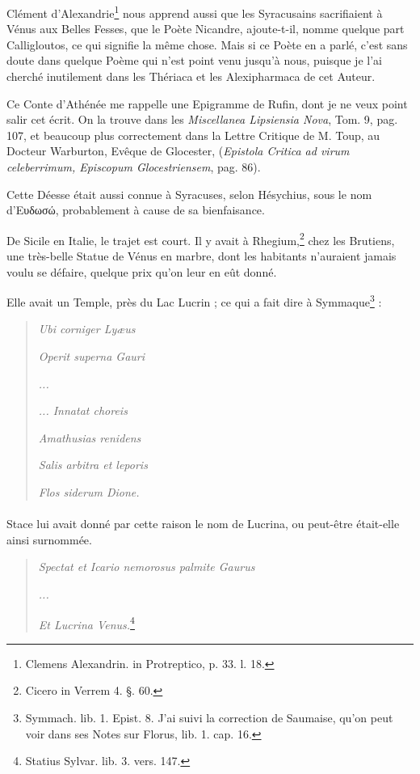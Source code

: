 \documentclass[a4paper, 11pt, oneside, polutonikogreek, french]{article}
\begin{document}
Clément d'Alexandrie\footnote{Clemens Alexandrin. in Protreptico, p. 33. l. 18.} nous apprend aussi que les Syracusains sacrifiaient à Vénus aux Belles Fesses, que le Poète Nicandre, ajoute-t-il, nomme quelque part Calligloutos, ce qui signifie la même chose. Mais si ce Poète en a parlé, c'est sans doute dans quelque Poème qui n'est point venu jusqu'à nous, puisque je l'ai cherché inutilement dans les Thériaca et les Alexipharmaca de cet Auteur.

Ce Conte d'Athénée me rappelle une Epigramme de Rufin, dont je ne veux point salir cet écrit. On la trouve dans les \emph{Miscellanea Lipsiensia Nova}, Tom. 9, pag. 107, et beaucoup plus correctement dans la Lettre Critique de M. Toup, au Docteur Warburton, Evêque de Glocester, (\emph{Epistola Critica ad virum celeberrimum, Episcopum Glocestriensem}, pag. 86).

Cette Déesse était aussi connue à Syracuses, selon Hésychius, sous le nom d'Ευδωσώ, probablement à cause de sa bienfaisance.

De Sicile en Italie, le trajet est court. Il y avait à Rhegium,\footnote{Cicero in Verrem 4. §. 60.} chez les Brutiens, une très-belle Statue de Vénus en marbre, dont les habitants n'auraient jamais voulu se défaire, quelque prix qu'on leur en eût donné.

Elle avait un Temple, près du Lac Lucrin ; ce qui a fait dire à Symmaque\footnote{Symmach. lib. 1. Epist. 8. J'ai suivi la correction de Saumaise, qu'on peut voir dans ses Notes sur Florus, lib. 1. cap. 16.} :
\begin{quotation}
\emph{Ubi corniger Lyæus}

\emph{Operit superna Gauri}

\emph{...}

\emph{... Innatat choreis}

\emph{Amathusias renidens}

\emph{Salis arbitra et leporis}

\emph{Flos siderum Dione.}
\end{quotation}
\paragraph{}
Stace lui avait donné par cette raison le nom de Lucrina, ou peut-être était-elle ainsi surnommée.
\begin{quotation}
\emph{Spectat et Icario nemorosus palmite Gaurus}

\emph{...}

\emph{Et Lucrina Venus.}\footnote{Statius Sylvar. lib. 3. vers. 147.}
\end{quotation}
\end{document}
